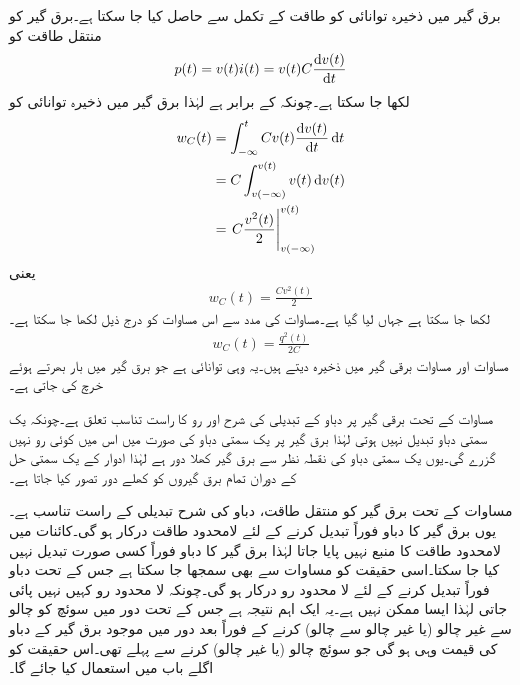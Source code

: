 برق گیر میں ذخیرہ توانائی  کو طاقت کے تکمل سے حاصل کیا جا سکتا ہے۔برق گیر کو منتقل طاقت  کو
\begin{align}\label{مساوات_امالہ_طاقت_برق_گیر}
p(t)=v(t)i(t)=v(t) C \frac{\dif v(t)}{\dif t}
\end{align}
لکھا جا سکتا ہے۔چونکہ  کے برابر ہے  لہٰذا برق گیر میں ذخیرہ توانائی کو
\begin{align*}
w_C(t)&=\int_{-\infty}^{t} C v(t) \frac{\dif v(t)}{\dif t} \dif t\\
&=C\int_{v(-\infty)}^{v(t)} v(t) \dif v(t)\\
&=\left. C \frac{v^2(t)}{2} \right|_{v(-\infty)}^{v(t)}
\end{align*}
یعنی
\begin{align}\label{مسوات_امالہ_توانائی_برق_گیر_الف}
w_C(t)=\frac{C v^2(t)}{2}
\end{align}
لکھا جا سکتا ہے جہاں  لیا گیا ہے۔مساوات  کی مدد سے اس مساوات کو درج ذیل لکھا جا سکتا ہے۔
\begin{align}\label{مسوات_امالہ_توانائی_برق_گیر_ب}
w_C(t)=\frac{q^2(t)}{2C}
\end{align}
مساوات  اور مساوات  برقی گیر میں ذخیرہ  دیتے ہیں۔یہ وہی توانائی ہے جو برق گیر میں بار بھرتے ہوئے خرچ کی جاتی ہے۔

مساوات  کے تحت برقی گیر پر دباو کے تبدیلی کی شرح اور رو کا راست تناسب تعلق ہے۔چونکہ یک سمتی دباو تبدیل نہیں ہوتی لہٰذا برق گیر پر یک سمتی دباو کی صورت میں اس میں کوئی رو نہیں گزرے گی۔یوں یک سمتی دباو کی نقطہ نظر سے برق گیر کھلا دور ہے لہٰذا ادوار کے یک سمتی حل کے دوران تمام برق گیروں کو کھلے دور تصور کیا جاتا ہے۔

مساوات  کے تحت برق گیر کو منتقل طاقت، دباو کی شرح تبدیلی  کے راست تناسب ہے۔یوں برق گیر کا دباو فوراً تبدیل کرنے کے لئے لامحدود طاقت درکار ہو گی۔کائنات میں لامحدود طاقت کا منبع نہیں پایا جاتا لہٰذا برق گیر کا دباو فوراً کسی صورت تبدیل نہیں کیا جا سکتا۔اسی حقیقت کو مساوات  سے بھی سمجھا جا سکتا ہے جس کے تحت دباو فوراً تبدیل کرنے کے لئے لا محدود رو درکار ہو گی۔چونکہ لا محدود رو کہیں نہیں پائی جاتی لہٰذا ایسا ممکن نہیں ہے۔یہ ایک اہم نتیجہ ہے جس کے تحت دور میں سوئچ کو چالو سے غیر چالو (یا غیر چالو سے چالو) کرنے کے فوراً بعد دور میں موجود  برق گیر کے دباو کی قیمت وہی ہو گی جو سوئچ چالو (یا غیر چالو) کرنے سے پہلے تھی۔اس حقیقت کو اگلے باب میں استعمال کیا جائے گا۔

